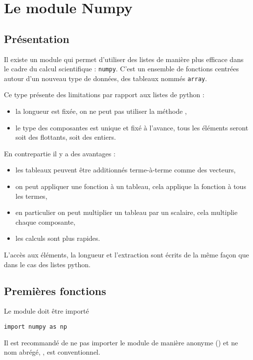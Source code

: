 \section{Le module Numpy}
\subsection{Présentation}
Il existe un module qui permet d'utiliser des listes de manière plus efficace dans le cadre du calcul scientifique : {\tt  numpy}. C'est un ensemble de fonctions centrées autour d'un nouveau type de données, des tableaux nommés {\tt array}. 

Ce type présente des limitations par rapport aux listes de python :

\begin{itemize}
\item la longueur est fixée, on ne peut pas utiliser la méthode ,
\item le type des composantes est unique et fixé à l'avance, tous les éléments seront soit des flottants, soit des entiers.
\end{itemize}

En contrepartie il y a des avantages :

\begin{itemize}
\item les tableaux peuvent être additionnés terme-à-terme comme des vecteurs,
\item on peut appliquer une fonction à un tableau, 
cela applique la fonction à tous les termes,
\item en particulier on peut multiplier un tableau par un scalaire, cela multiplie chaque composante,
\item les calculs sont plus rapides.
\end{itemize}

L'accès aux éléments, la longueur et l'extraction sont écrits de la même façon que dans le cas des listes python.
\subsection{Premières fonctions}
Le module doit être importé 
\begin{lstlisting}
import numpy as np
\end{lstlisting}
Il est recommandé de ne pas importer le module de manière anonyme () et ne nom abrégé, , est conventionnel.


